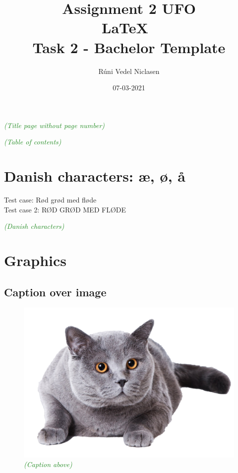 \documentclass{article}
\title{Assignment 2 UFO \\ \LaTeX\ \\ Task 2 - Bachelor Template}
\date{07-03-2021}
\author{Rúni Vedel Niclasen}
\newcommand{\ccheck}[1]{\textcolor{ForestGreen}{\emph{(\checkmark #1)}}} %
\begin{document}
\maketitle
\thispagestyle{empty} %
\ccheck{Title page without page number}

\newpage
\thispagestyle{empty} %
\tableofcontents
\ccheck{Table of contents}

\newpage
{}

\section{Danish characters: æ, ø, å}
Test case: Rød grød med fløde\\
Test case 2: RØD GRØD MED FLØDE

\ccheck{Danish characters}

\section{Graphics}

\subsection{Caption over image}
\begin{figure}[H]
    \caption{\ccheck{Caption above}} %
    \includegraphics[scale=0.3]{catpng}
\end{figure}
\end{document}
